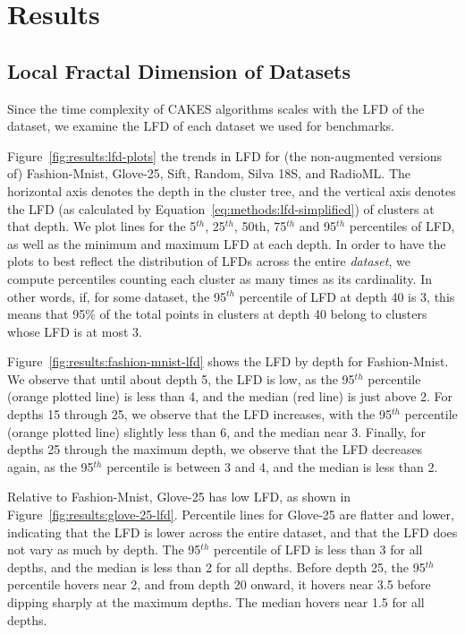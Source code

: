 \section{Results}
\label{sec:results}


\subsection{Local Fractal Dimension of Datasets}
\label{sec:results:lfd-of-datasets}

Since the time complexity of CAKES algorithms scales with the LFD of the dataset, we examine the LFD of each dataset we used for benchmarks.

Figure~\ref{fig:results:lfd-plots} the trends in LFD for (the non-augmented versions of) Fashion-Mnist, Glove-25, Sift, Random, Silva 18S, and RadioML.
The horizontal axis denotes the depth in the cluster tree, and the vertical axis denotes the LFD (as calculated by Equation~\ref{eq:methods:lfd-simplified}) of clusters at that depth.
We plot lines for the 5$^{th}$, 25$^{th}$, 50th, 75$^{th}$ and 95$^{th}$ percentiles of LFD, as well as the minimum and maximum LFD at each depth.
In order to have the plots to best reflect the distribution of LFDs across the entire \emph{dataset}, we compute percentiles counting each cluster as many times as its cardinality.
In other words, if, for some dataset, the 95$^{th}$ percentile of LFD at depth 40 is 3, this means that 95\% of the total points in clusters at depth 40 belong to clusters whose LFD is at most 3.

Figure~\ref{fig:results:fashion-mnist-lfd} shows the LFD by depth for Fashion-Mnist.
We observe that until about depth 5, the LFD is low, as the 95$^{th}$ percentile (orange plotted line) is less than 4, and the median (red line) is just above 2.
For depths 15 through 25, we observe that the LFD increases, with the 95$^{th}$ percentile (orange plotted line) slightly less than 6, and the median near 3.
Finally, for depths 25 through the maximum depth, we observe that the LFD decreases again, as the 95$^{th}$ percentile is between 3 and 4, and the median is less than 2.

Relative to Fashion-Mnist, Glove-25 has low LFD, as shown in Figure~\ref{fig:results:glove-25-lfd}.
Percentile lines for Glove-25 are flatter and lower, indicating that the LFD is lower across the entire dataset, and that the LFD does not vary as much by depth.
The 95$^{th}$ percentile of LFD is less than 3 for all depths, and the median is less than 2 for all depths. 
Before depth 25, the 95$^{th}$ percentile hovers near 2, and from depth 20 onward, it hovers near 3.5 before dipping sharply at the maximum depths.
The median hovers near 1.5 for all depths.

